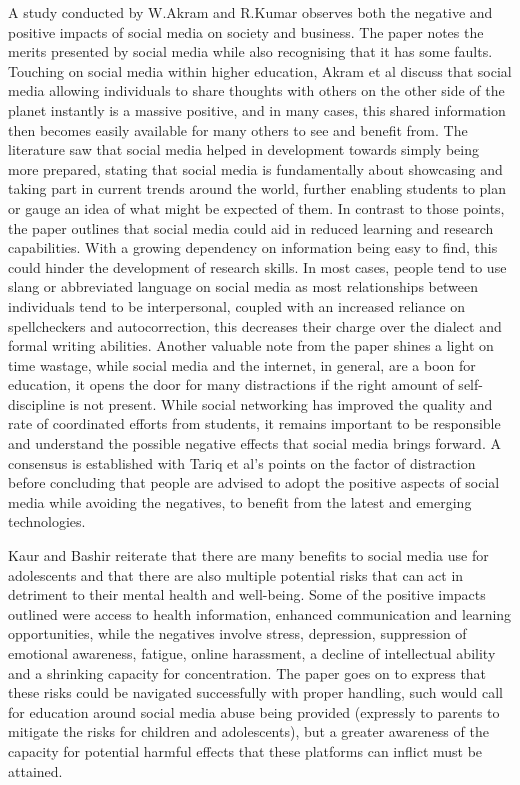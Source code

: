 \documentclass[lettersize,journal]{IEEEtran}
\begin{document}
    A study conducted by W.Akram and R.Kumar \cite{Akram et al 2017} observes both the negative
    and positive impacts of social media on society and business.  The paper notes the merits presented by social media
    while also recognising that it has some faults. Touching on social media within higher education, Akram et al
    discuss that social media allowing individuals to share thoughts with others on the other side of the planet instantly
    is a massive positive, and in many cases, this shared information then becomes easily available for many others to
    see and benefit from. The literature saw that social media helped in development towards simply being more prepared, stating that
    social media is fundamentally about showcasing and taking part in  current trends around the world, further enabling students
    to plan or gauge an idea of what might be expected of them. In contrast to those points, the paper outlines that
    social media could aid in reduced learning and research capabilities. With a growing dependency on information
    being easy to find, this could hinder the development of research skills. In most cases, people tend to use slang or
    abbreviated language on social media as most relationships between individuals tend to be interpersonal, coupled
    with an increased reliance on spellcheckers and autocorrection, this decreases their charge over the dialect and
    formal writing abilities. Another valuable note from the paper shines a light on time wastage, while social media
    and the internet, in general, are a boon for education, it opens the door for many distractions if the right amount
    of self-discipline is not present. While social networking has improved the quality and rate of coordinated
    efforts from students, it remains important to be responsible and understand the possible negative effects
    that social media brings forward. A consensus is established with Tariq et al's \cite{Tariq et al 2012}
    points on the factor of distraction before concluding that people are advised to adopt the positive aspects of
    social media while avoiding the negatives, to benefit from the latest and emerging technologies.

    Kaur and Bashir \cite{Bashir et al 2015} reiterate that there are many benefits to social media use
    for adolescents and that there are also multiple potential risks that can act in detriment to their
    mental health and well-being. Some of the positive impacts outlined were access to health information,
    enhanced communication and learning opportunities, while the negatives involve stress, depression,
    suppression of emotional awareness, fatigue, online harassment, a decline of intellectual ability
    and a shrinking capacity for concentration. The paper goes on to express that these risks could be
    navigated successfully with proper handling, such would call for education around social media abuse
    being provided (expressly to parents to mitigate the risks for children and adolescents), but a greater
    awareness of the capacity for potential harmful effects that these platforms can inflict must be attained.
\end{document}
